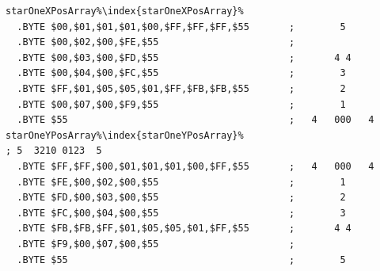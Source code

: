 \begin{lstlisting}[caption=Source code for the Star.,escapechar=\%]
starOneXPosArray%\index{starOneXPosArray}%  
  .BYTE $00,$01,$01,$01,$00,$FF,$FF,$FF,$55       ;        5       
  .BYTE $00,$02,$00,$FE,$55                       ;                
  .BYTE $00,$03,$00,$FD,$55                       ;       4 4      
  .BYTE $00,$04,$00,$FC,$55                       ;        3       
  .BYTE $FF,$01,$05,$05,$01,$FF,$FB,$FB,$55       ;        2       
  .BYTE $00,$07,$00,$F9,$55                       ;        1       
  .BYTE $55                                       ;   4   000   4  
starOneYPosArray%\index{starOneYPosArray}%                                  ; 5  3210 0123  5  
  .BYTE $FF,$FF,$00,$01,$01,$01,$00,$FF,$55       ;   4   000   4  
  .BYTE $FE,$00,$02,$00,$55                       ;        1       
  .BYTE $FD,$00,$03,$00,$55                       ;        2       
  .BYTE $FC,$00,$04,$00,$55                       ;        3       
  .BYTE $FB,$FB,$FF,$01,$05,$05,$01,$FF,$55       ;       4 4      
  .BYTE $F9,$00,$07,$00,$55                       ;                
  .BYTE $55                                       ;        5       
\end{lstlisting}




